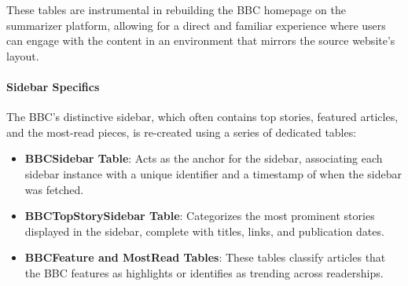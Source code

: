 \documentclass[10pt]{article}
\begin{document}
These tables are instrumental in rebuilding the BBC homepage on the summarizer platform, allowing for a direct and familiar experience where users can engage with the content in an environment that mirrors the source website's layout.

\paragraph{Sidebar Specifics}
The BBC's distinctive sidebar, which often contains top stories, featured articles, and the most-read pieces, is re-created using a series of dedicated tables:

\begin{itemize}
    \item \textbf{BBCSidebar Table}: Acts as the anchor for the sidebar, associating each sidebar instance with a unique identifier and a timestamp of when the sidebar was fetched.
    \item \textbf{BBCTopStorySidebar Table}: Categorizes the most prominent stories displayed in the sidebar, complete with titles, links, and publication dates.
    \item \textbf{BBCFeature and MostRead Tables}: These tables classify articles that the BBC features as highlights or identifies as trending across readerships.
\end{itemize}
\end{document}
